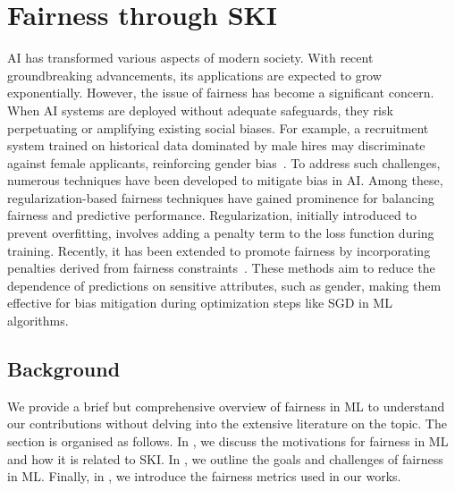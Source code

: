 
\chapter[Fairness through SKI]{Fairness through \gls{SKI}}
\label{ch:fairness-through-ski}
\minitoc

\Gls{AI} has transformed various aspects of modern society.
%
With recent groundbreaking advancements, its applications are expected to grow exponentially.
%
However, the issue of fairness has become a significant concern.
%
When \gls{AI} systems are deployed without adequate safeguards, they risk perpetuating or amplifying existing social biases.
%
For example, a recruitment system trained on historical data dominated by male hires may discriminate against female applicants, reinforcing gender bias~\cite{kochling2020genderbias}.
%
To address such challenges, numerous techniques have been developed to mitigate bias in \gls{AI}.
%
Among these, regularization-based fairness techniques have gained prominence for balancing fairness and predictive performance.
%
Regularization, initially introduced to prevent overfitting, involves adding a penalty term to the loss function during training.
%
Recently, it has been extended to promote fairness by incorporating penalties derived from fairness constraints~\cite{kamishima2011fairness}.
%
These methods aim to reduce the dependence of predictions on sensitive attributes, such as gender, making them effective for bias mitigation during optimization steps like \gls{SGD} in \gls{ML} algorithms.
%

\section{Background}\label{sec:fairness-background}
%
We provide a brief but comprehensive overview of fairness in \gls{ML} to understand our contributions without delving into the extensive literature on the topic.
%
The section is organised as follows.
%
In , we discuss the motivations for fairness in \gls{ML} and how it is related to \gls{SKI}.
%
In , we outline the goals and challenges of fairness in \gls{ML}.
%
Finally, in , we introduce the fairness metrics used in our works.


